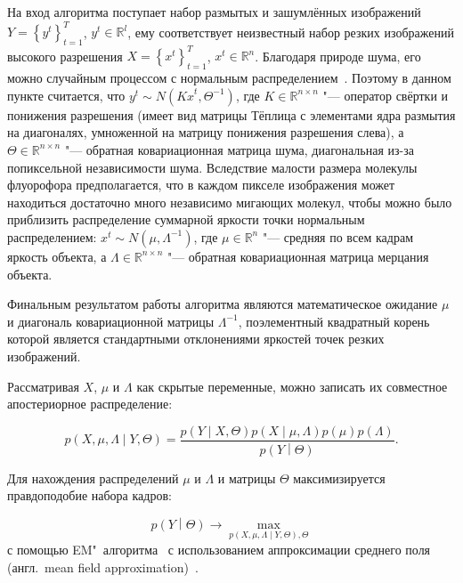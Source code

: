 На вход алгоритма поступает набор размытых и зашумлённых изображений $Y=\left\{y^t\right\}_{t=1}^T$, $y^t\in\mathbb{R}^l$, ему соответствует неизвестный набор резких изображений высокого разрешения $X=\left\{x^t\right\}_{t=1}^T$, $x^t\in\mathbb{R}^n$. Благодаря природе шума, его можно  случайным процессом с нормальным распределением~\cite{gadsden1965some}. Поэтому в данном пункте считается, что $y^t \sim N({Kx}^t,\Theta^{-1})$, где $K\in\mathbb{R}^{n \times n}$ "--- оператор свёртки и понижения разрешения (имеет вид матрицы Тёплица с элементами ядра размытия на диагоналях, умноженной на матрицу понижения разрешения слева), а $\Theta\in\mathbb{R}^{n \times n}$ "--- обратная ковариационная матрица шума, диагональная из-за попиксельной независимости шума. Вследствие малости размера молекулы флуорофора предполагается, что в каждом пикселе изображения может находиться достаточно много независимо мигающих молекул, чтобы можно было приблизить распределение суммарной яркости точки нормальным распределением: $x^t \sim N(\mu,\Lambda^{-1})$, где $\mu\in\mathbb{R}^n$ "--- средняя по всем кадрам яркость объекта, а $\Lambda\in\mathbb{R}^{n \times n}$ "--- обратная ковариационная матрица мерцания объекта.

Финальным результатом работы алгоритма являются математическое ожидание $\mu$ и диагональ ковариационной матрицы $\Lambda^{-1}$, поэлементный квадратный корень которой является стандартными отклонениями яркостей точек резких изображений. 

Рассматривая $X$, $\mu$ и $\Lambda$ как скрытые переменные, можно записать их совместное апостериорное распределение:

\begin{equation*}
	p\left(X,\mu,\Lambda\middle|Y,\Theta\right)=\frac{p\left(Y\middle|X,\Theta\right)p\left(X\middle|\mu,\Lambda\right)p\left(\mu\right)p\left(\Lambda\right)}{p\left(Y\middle|\Theta\right)}.
\end{equation*}

Для нахождения распределений $\mu$ и $\Lambda$ и матрицы $\Theta$ максимизируется правдоподобие набора кадров:

\begin{equation*}
	p\left(Y\middle|\Theta\right) \rightarrow \max_{p \left( X, \mu, \Lambda \middle| Y,\Theta \right),\Theta}
\end{equation*}
с помощью EM"~алгоритма~\cite{477e7e2b-4ded-3369-981e-9b40850a2701} с использованием аппроксимации среднего поля (англ.~mean field approximation)~\cite{bishop2006pattern}.

